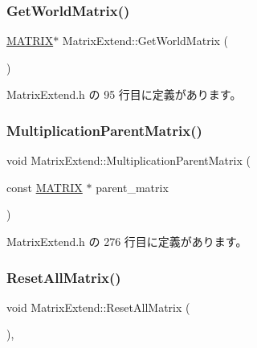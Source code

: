 \subsubsection{\texorpdfstring{Get\+World\+Matrix()}{GetWorldMatrix()}}
{\footnotesize\ttfamily \mbox{\hyperlink{_vector3_d_8h_a032295cd9fb1b711757c90667278e744}{M\+A\+T\+R\+IX}}$\ast$ Matrix\+Extend\+::\+Get\+World\+Matrix (\begin{DoxyParamCaption}{ }\end{DoxyParamCaption})\hspace{0.3cm}{\ttfamily [inline]}}



 Matrix\+Extend.\+h の 95 行目に定義があります。

\mbox{\label{class_matrix_extend_a1847728feb977bd7ccdf1987953fe203}} 
\subsubsection{\texorpdfstring{Multiplication\+Parent\+Matrix()}{MultiplicationParentMatrix()}}
{\footnotesize\ttfamily void Matrix\+Extend\+::\+Multiplication\+Parent\+Matrix (\begin{DoxyParamCaption}\item[{const \mbox{\hyperlink{_vector3_d_8h_a032295cd9fb1b711757c90667278e744}{M\+A\+T\+R\+IX}} $\ast$}]{parent\+\_\+matrix }\end{DoxyParamCaption})\hspace{0.3cm}{\ttfamily [inline]}}



 Matrix\+Extend.\+h の 276 行目に定義があります。

\mbox{\label{class_matrix_extend_a81db064716c74390d9c4b7e1022a4b27}} 
\subsubsection{\texorpdfstring{Reset\+All\+Matrix()}{ResetAllMatrix()}}
{\footnotesize\ttfamily void Matrix\+Extend\+::\+Reset\+All\+Matrix (\begin{DoxyParamCaption}{ }\end{DoxyParamCaption})\hspace{0.3cm}{\ttfamily [inline]}, {\ttfamily [private]}}




